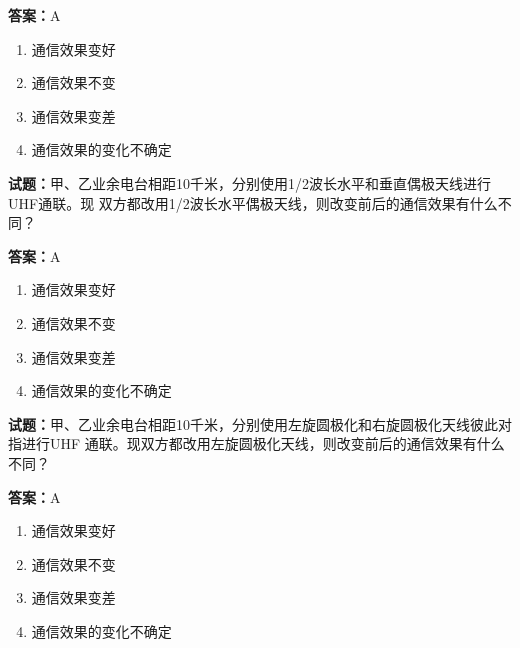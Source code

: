 \documentclass{ctexbook}
\begin{document}
\textbf{答案：}A 

\begin{enumerate}[leftmargin=3em]
  \item 通信效果变好 


  \item 通信效果不变 

  \item 通信效果变差 

  \item 通信效果的变化不确定 

\end{enumerate}





\vspace{1em}

\textbf{试题：}甲、乙业余电台相距10千米，分别使用1/2波长水平和垂直偶极天线进行UHF通联。现
双方都改用1/2波长水平偶极天线，则改变前后的通信效果有什么不同？ 

\textbf{答案：}A 

\begin{enumerate}[leftmargin=3em]
  \item 通信效果变好 

  \item 通信效果不变 

  \item 通信效果变差 

  \item 通信效果的变化不确定 

\end{enumerate}





\vspace{1em}

\textbf{试题：}甲、乙业余电台相距10千米，分别使用左旋圆极化和右旋圆极化天线彼此对指进行UHF
通联。现双方都改用左旋圆极化天线，则改变前后的通信效果有什么不同？ 

\textbf{答案：}A 

\begin{enumerate}[leftmargin=3em]
  \item 通信效果变好 

  \item 通信效果不变 

  \item 通信效果变差 

  \item 通信效果的变化不确定 

\end{enumerate}
\end{document}
